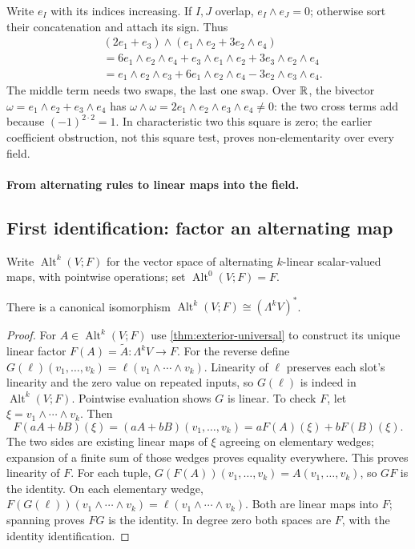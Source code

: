 \begin{example}
Write $e_I$ with its indices increasing. If $I,J$ overlap, $e_I\wedge e_J=0$;
otherwise sort their concatenation and attach its sign. Thus
\begin{align*}
&(2e_1+e_3)\wedge(e_1\wedge e_2+3e_2\wedge e_4)\\
&=6e_1\wedge e_2\wedge e_4+e_3\wedge e_1\wedge e_2
+3e_3\wedge e_2\wedge e_4\\
&=e_1\wedge e_2\wedge e_3+6e_1\wedge e_2\wedge e_4
-3e_2\wedge e_3\wedge e_4.
\end{align*}
The middle term needs two swaps, the last one swap. Over $\mathbb{R}$, the
bivector $\omega=e_1\wedge e_2+e_3\wedge e_4$ has
$\omega\wedge\omega=2e_1\wedge e_2\wedge e_3\wedge e_4\ne0$:
the two cross terms add because $(-1)^{2\cdot2}=1$.
In characteristic two this square is zero; the earlier coefficient
obstruction, not this square test, proves non-elementarity over every field.
\end{example}
\paragraph{From alternating rules to linear maps into the field.}
\subsection{First identification: factor an alternating map}
Write $\operatorname{Alt}^k(V;F)$ for the vector space of alternating
$k$-linear scalar-valued maps, with pointwise operations; set $\operatorname{Alt}^0(V;F)=F$.
\begin{proposition}
There is a canonical isomorphism
$\operatorname{Alt}^k(V;F)\cong(\Lambda^kV)^*$.
\end{proposition}
\begin{proof}
For $A\in\operatorname{Alt}^k(V;F)$ use \cref{thm:exterior-universal} to
construct its unique linear factor $F(A)=\widetilde A:\Lambda^kV\to F$.
For the reverse define $G(\ell)(v_1,\ldots,v_k)=\ell(v_1\wedge\cdots\wedge v_k)$.
Linearity of $\ell$ preserves each slot's linearity and the zero value on
repeated inputs, so $G(\ell)$ is indeed in $\operatorname{Alt}^k(V;F)$.
Pointwise evaluation shows $G$ is linear. To check $F$, let
$\xi=v_1\wedge\cdots\wedge v_k$. Then
\[
F(aA+bB)(\xi)=(aA+bB)(v_1,\ldots,v_k)
=aF(A)(\xi)+bF(B)(\xi).
\]
The two sides are existing linear maps of $\xi$ agreeing on elementary
wedges; expansion of a finite sum of those wedges proves equality everywhere.
This proves linearity of $F$.
For each tuple, $G(F(A))(v_1,\ldots,v_k)=A(v_1,\ldots,v_k)$, so $GF$ is
the identity. On each elementary wedge,
$F(G(\ell))(v_1\wedge\cdots\wedge v_k)=\ell(v_1\wedge\cdots\wedge v_k)$.
Both are linear maps into $F$; spanning proves $FG$ is the identity.
In degree zero both spaces are $F$, with the identity identification.
\end{proof}

